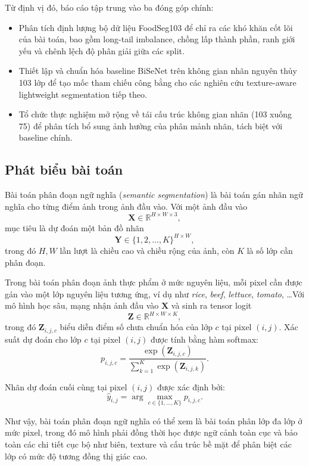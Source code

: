 Từ định vị đó, báo cáo tập trung vào ba đóng góp chính:
\begin{itemize}[leftmargin=1.5em]
    \item Phân tích định lượng bộ dữ liệu FoodSeg103 để chỉ ra các khó khăn cốt lõi của bài toán, bao gồm long-tail imbalance, chồng lấp thành phần, ranh giới yếu và chênh lệch độ phân giải giữa các split.
    \item Thiết lập và chuẩn hóa baseline BiSeNet trên không gian nhãn nguyên thủy 103 lớp để tạo mốc tham chiếu công bằng cho các nghiên cứu texture-aware lightweight segmentation tiếp theo.
    \item Tổ chức thực nghiệm mở rộng về tái cấu trúc không gian nhãn (103 xuống 75) để phân tích bổ sung ảnh hưởng của phân mảnh nhãn, tách biệt với baseline chính.
\end{itemize}

\subsection{Phát biểu bài toán}

Bài toán phân đoạn ngữ nghĩa (\textit{semantic segmentation}) là bài toán gán nhãn ngữ nghĩa cho từng điểm ảnh trong ảnh đầu vào. Với một ảnh đầu vào
\[
\mathbf{X} \in \mathbb{R}^{H \times W \times 3},
\]
mục tiêu là dự đoán một bản đồ nhãn
\[
\mathbf{Y} \in \{1,2,\dots,K\}^{H \times W},
\]
trong đó $H, W$ lần lượt là chiều cao và chiều rộng của ảnh, còn $K$ là số lớp cần phân đoạn.

Trong bài toán phân đoạn ảnh thực phẩm ở mức nguyên liệu, mỗi pixel cần được gán vào một lớp nguyên liệu tương ứng, ví dụ như \textit{rice}, \textit{beef}, \textit{lettuce}, \textit{tomato}, \dots Với mô hình học sâu, mạng nhận ảnh đầu vào $\mathbf{X}$ và sinh ra tensor logit
\[
\mathbf{Z} \in \mathbb{R}^{H \times W \times K},
\]
trong đó $\mathbf{Z}_{i,j,c}$ biểu diễn điểm số chưa chuẩn hóa của lớp $c$ tại pixel $(i,j)$. Xác suất dự đoán cho lớp $c$ tại pixel $(i,j)$ được tính bằng hàm softmax:
\[
p_{i,j,c} = \frac{\exp(\mathbf{Z}_{i,j,c})}{\sum_{k=1}^{K} \exp(\mathbf{Z}_{i,j,k})}.
\]

Nhãn dự đoán cuối cùng tại pixel $(i,j)$ được xác định bởi:
\[
\hat{y}_{i,j} = \arg\max_{c \in \{1,\dots,K\}} p_{i,j,c}.
\]

Như vậy, bài toán phân đoạn ngữ nghĩa có thể xem là bài toán phân lớp đa lớp ở mức pixel, trong đó mô hình phải đồng thời học được ngữ cảnh toàn cục và bảo toàn các chi tiết cục bộ như biên, texture và cấu trúc bề mặt để phân biệt các lớp có mức độ tương đồng thị giác cao.

